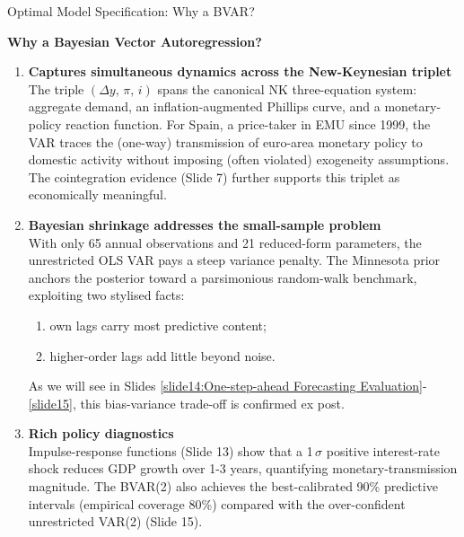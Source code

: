 \documentclass[9pt]{beamer}
\begin{document}
\begin{frame}{Optimal Model Specification: Why a BVAR?}

\textbf{\footnotesize Why a Bayesian Vector Autoregression?}

\scriptsize
\begin{enumerate}
  \item \textbf{Captures simultaneous dynamics across the New-Keynesian triplet}\\
        The triple $(\Delta y,\,\pi,\,i)$ spans the canonical NK three-equation system: aggregate demand, an inflation-augmented Phillips curve, and a monetary-policy reaction function. For Spain, a price-taker in EMU since 1999, the VAR traces the (one-way) transmission of euro-area monetary policy to domestic activity without imposing (often violated) exogeneity assumptions. The cointegration evidence (Slide 7) further supports this triplet as economically meaningful.

  \item \textbf{Bayesian shrinkage addresses the small-sample problem}\\
        With only 65 annual observations and 21 reduced-form parameters, the unrestricted OLS VAR pays a steep variance penalty. The Minnesota prior anchors the posterior toward a parsimonious random-walk benchmark, exploiting two stylised facts: 
        \begin{enumerate}
            \item own lags carry most predictive content;
            \item higher-order lags add little beyond noise.
        \end{enumerate}
        As we will see in Slides \ref{slide14:One-step-ahead Forecasting Evaluation}-\ref{slide15}, this bias-variance trade-off is confirmed ex post.

  \item \textbf{Rich policy diagnostics}\\
        Impulse-response functions (Slide 13) show that a 1\,$\sigma$ positive interest-rate shock reduces GDP growth over 1-3 years, quantifying monetary-transmission magnitude. The BVAR(2) also achieves the best-calibrated 90\% predictive intervals (empirical coverage 80\%) compared with the over-confident unrestricted VAR(2) (Slide 15).


\end{enumerate}
\end{frame}
\end{document}
